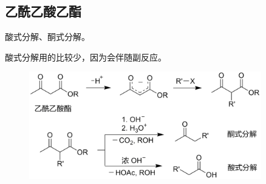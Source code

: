 \subsection{乙酰乙酸乙酯}

酸式分解、酮式分解。

酸式分解用的比较少，因为会伴随副反应。


\begin{figure}[H]
    \centering
    \includegraphics[width=0.9\textwidth]{img/AcetoaceticEsterSynthesis.png}
\end{figure}